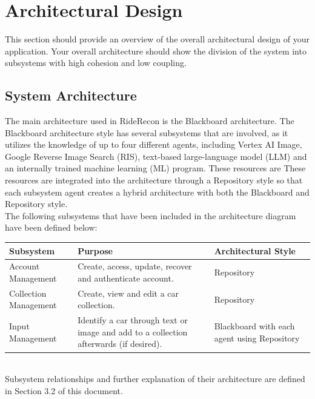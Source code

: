 \documentclass[]{article}
\begin{document}
\section{Architectural Design}
\label{sec:architectural_design}
This section should provide an overview of the overall architectural design of your application. Your overall architecture should show the division of the system into subsystems with high cohesion and low coupling.

\subsection{System Architecture}
\label{sub:system_architecture}
The main architecture used in RideRecon is the Blackboard architecture. The Blackboard architecture style has several subsystems that are involved, as it utilizes the knowledge of up to four different agents, including Vertex AI Image, Google Reverse Image Search (RIS), text-based large-language model (LLM) and an internally trained machine learning (ML) program. These resources are These resources are integrated into the architecture through a Repository style so that each subsystem agent creates a hybrid architecture with both the Blackboard and Repository style.\\

\noindent The following subsystems that have been included in the architecture diagram have been defined below:\\

\noindent
\begin{tabular}{|p{4cm}|p{7cm}|p{3.5cm}|}
	\hline
	Subsystem & Purpose & Architectural Style \\
	\hline
	Account Management & Create, access, update, recover and authenticate account. & Repository \\
	\hline
	Collection Management & Create, view and edit a car collection. & Repository \\
	\hline
	Input Management & Identify a car through text or image and add to a collection afterwards (if desired). & Blackboard with each agent using Repository \\
	\hline
\end{tabular}

\\
\noindent Subsystem relationships and further explanation of their architecture are defined in Section 3.2 of this document.\\
\end{document}
